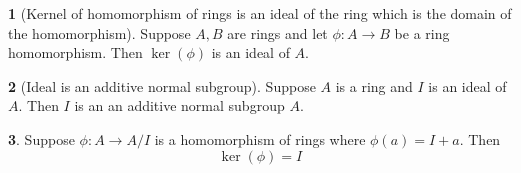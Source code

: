 \documentclass[12pt]{article}
\theoremstyle{definition}
\newtheorem{theorem}{\color{ForestGreen}{\textbf{Theorem}}}
\begin{document}
\begin{theorem}[Kernel of homomorphism of rings is an ideal of the ring which is the domain of the homomorphism]
Suppose $A,B$ are rings and let $\phi:A \to B$ be a ring homomorphism. Then $\ker(\phi)$ is an ideal of $A$.
\end{theorem}

\begin{theorem}[Ideal is an additive normal subgroup]
Suppose $A$ is a ring and $I$ is an ideal of $A$. Then $I$ is an an additive normal subgroup $A$.
\end{theorem}

\begin{theorem}
Suppose $\phi : A \to A/I$ is a homomorphism of rings where $\phi(a) = I + a$. Then
\begin{equation}
\ker(\phi) = I
\end{equation}
\end{theorem}
\end{document}
